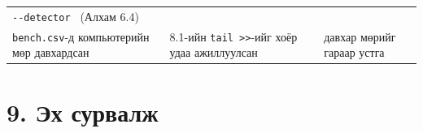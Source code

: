 \begin{longtable}[]{@{}lll@{}}
\begin{minipage}[t]{0.30\columnwidth}
\texttt{-\/-detector\ \textquotesingle{}\textquotesingle{}} (Алхам 6.4)\strut
\end{minipage}\tabularnewline
\begin{minipage}[t]{0.30\columnwidth}\raggedright
\texttt{bench.csv}-д компьютерийн мөр давхардсан\strut
\end{minipage} & \begin{minipage}[t]{0.30\columnwidth}\raggedright
8.1-ийн \texttt{tail\ \textgreater{}\textgreater{}}-ийг хоёр удаа ажиллуулсан\strut
\end{minipage} & \begin{minipage}[t]{0.30\columnwidth}\raggedright
давхар мөрийг гараар устга\strut
\end{minipage}\tabularnewline
\bottomrule
\end{longtable}\endgroup

\hypertarget{ux44dux445-ux441ux443ux440ux432ux430ux43bux436}{%
\section{9. Эх сурвалж}\label{ux44dux445-ux441ux443ux440ux432ux430ux43bux436}}

